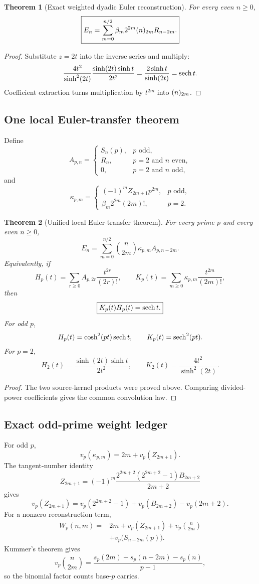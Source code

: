 \documentclass[11pt]{article}
\newtheorem{theorem}{Theorem}[section]\newtheorem{proposition}[theorem]{Proposition}\newtheorem{lemma}[theorem]{Lemma}\newtheorem{corollary}[theorem]{Corollary}
\theoremstyle{definition}\newtheorem{definition}[theorem]{Definition}\newtheorem{example}[theorem]{Example}\newtheorem{construction}[theorem]{Construction}\newtheorem{algorithm}[theorem]{Algorithm}\newtheorem{conjecture}[theorem]{Conjecture}\newtheorem{problem}[theorem]{Problem}
\theoremstyle{remark}\newtheorem{remark}[theorem]{Remark}\newtheorem{boundary}[theorem]{Boundary}\newtheorem{certificate}[theorem]{Computational Certificate}\newtheorem{classical}[theorem]{Classical Input}\newtheorem{principle}[theorem]{Structural Principle}
\begin{document}
\begin{theorem}[Exact weighted dyadic Euler reconstruction]
For every even $n\geq0$,
\[
 \boxed{E_n=\sum_{m=0}^{n/2}\beta_m2^{2m}(n)_{2m}R_{n-2m}.}
\]
\end{theorem}

\begin{proof}
Substitute $z=2t$ into the inverse series and multiply:
\[
 \frac{4t^2}{\sinh^2(2t)}\frac{\sinh(2t)\sinh t}{2t^2}
 =\frac{2\sinh t}{\sinh(2t)}=\operatorname{sech} t.
\]
Coefficient extraction turns multiplication by $t^{2m}$ into $(n)_{2m}$.
\end{proof}

\subsection{One local Euler-transfer theorem}
Define
\[
 A_{p,n}=\begin{cases}
 S_n(p),&p\text{ odd},\\
 R_n,&p=2\text{ and }n\text{ even},\\
 0,&p=2\text{ and }n\text{ odd},
 \end{cases}
\]
and
\[
 \kappa_{p,m}=\begin{cases}
 (-1)^mZ_{2m+1}p^{2m},&p\text{ odd},\\
 \beta_m2^{2m}(2m)!,&p=2.
 \end{cases}
\]

\begin{theorem}[Unified local Euler-transfer theorem]
For every prime $p$ and every even $n\geq0$,
\[
 \boxed{E_n=\sum_{m=0}^{n/2}\binom n{2m}\kappa_{p,m}A_{p,n-2m}.}
\]
Equivalently, if
\[
 H_p(t)=\sum_{r\geq0}A_{p,2r}\frac{t^{2r}}{(2r)!},
 \qquad
 K_p(t)=\sum_{m\geq0}\kappa_{p,m}\frac{t^{2m}}{(2m)!},
\]
then
\[
 \boxed{K_p(t)H_p(t)=\operatorname{sech} t.}
\]
For odd $p$,
\[
 H_p(t)=\cosh^2(pt)\operatorname{sech} t,
 \qquad K_p(t)=\operatorname{sech}^2(pt).
\]
For $p=2$,
\[
 H_2(t)=\frac{\sinh(2t)\sinh t}{2t^2},
 \qquad K_2(t)=\frac{4t^2}{\sinh^2(2t)}.
\]
\end{theorem}

\begin{proof}
The two source-kernel products were proved above. Comparing divided-power coefficients gives the common convolution law.
\end{proof}

\subsection{Exact odd-prime weight ledger}
For odd $p$,
\[
 v_p(\kappa_{p,m})=2m+v_p(Z_{2m+1}).
\]
The tangent-number identity
\[
 Z_{2m+1}=(-1)^m\frac{2^{2m+2}(2^{2m+2}-1)B_{2m+2}}{2m+2}
\]
gives
\[
 \boxed{v_p(Z_{2m+1})=v_p(2^{2m+2}-1)+v_p(B_{2m+2})-v_p(2m+2).}
\]
For a nonzero reconstruction term,
\[
 \boxed{\begin{aligned}
 W_p(n,m)={}&2m+v_p(Z_{2m+1})+v_p\binom n{2m}\\
 &+v_p\bigl(S_{n-2m}(p)\bigr).
 \end{aligned}}
\]
Kummer's theorem gives
\[
 v_p\binom n{2m}=\frac{s_p(2m)+s_p(n-2m)-s_p(n)}{p-1},
\]
so the binomial factor counts base-$p$ carries.
\end{document}
